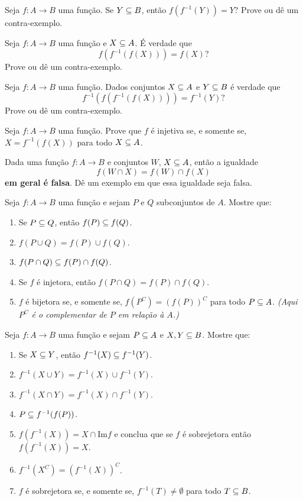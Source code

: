 \documentclass[12pt]{exam}
\begin{document}
\questao{} Seja $f : A \to B$ uma função. Se $Y \subseteq B$, então $f(f^{-1}(Y)) = Y$? Prove ou dê um contra-exemplo.

\vspace{.3cm}

\questao{} Seja $f : A \to B$ uma função e $X \subseteq A$. É verdade que
\[
    f(f^{-1}(f(X))) = f(X)?
\]
Prove ou dê um contra-exemplo.

\vspace{.3cm}

\questao{} Seja $f : A \to B$ uma função. Dados conjuntos $X \subseteq A$ e $Y \subseteq B$ é verdade que
\[
    f^{-1}(f(f^{-1}(f(X)))) = f^{-1}(Y)?
\]
Prove ou dê um contra-exemplo.

\vspace{.3cm}

\questao{} Seja $f : A \to B$ uma função. Prove que $f$ é injetiva se, e somente se, $X = f^{-1}(f(X))$ para todo $X \subseteq A$.

\vspace{.3cm}

\questao{} Dada uma função $f : A \to B$ e conjuntos $W$, $X \subseteq A$, então a igualdade
\[
    f(W \cap X) = f(W) \cap f(X)
\]
\textbf{em geral é falsa}. Dê um exemplo em que essa igualdade seja falsa.

\vspace{.3cm}

\questao{} Seja $f : A \to B$ uma fun\c{c}\~ao e sejam $P$ e $Q$ subconjuntos de $A$. Mostre que:
\begin{enumerate}[label={\alph*})]
    \item Se $P\subseteq Q$, ent{\~a}o $f(P)\subseteq f(Q)$.
    \item $f(P\cup Q) = f(P)\cup f(Q)$.
    \item $f(P\cap Q)\subseteq f(P)\cap f(Q)$.
    \item Se $f$ {\'e} injetora, ent{\~a}o $f(P\cap Q) =  f(P)\cap f(Q)$.
    \item $f$ {\'e} bijetora se, e somente se, $f(P^C) = (f(P))^C$ para todo $P \subseteq A$. \textit{(Aqui $P^C$ \'e o complementar de $P$ em rela\c{c}\~ao \`a $A$.)}
\end{enumerate}

\vspace{.3cm}

\questao{} Seja $f : A \to B$ uma fun{\c c}{\~a}o e sejam $P \subseteq
A$ e $X, Y\subseteq B$. Mostre que:
\begin{enumerate}[label={\alph*})]
    \item Se $X\subseteq Y$, ent{\~a}o $f^{-1}(X)\subseteq f^{-1}(Y)$.
    \item $f^{-1}(X\cup Y)=f^{-1}(X)\cup f^{-1}(Y)$.
    \item $f^{-1}(X\cap Y)= f^{-1}(X)\cap f^{-1}(Y)$.
    \item $P\subseteq f^{-1}(f(P))$.
    \item $f(f^{-1}(X))= X \cap \mbox{Im}f$ e conclua que se $f$ {\'e} sobrejetora ent{\~a}o
    $f(f^{-1}(X))=X$.
    \item $f^{-1}(X^C) = (f^{-1}(X))^C$.
    \item $f$ \'e sobrejetora se, e somente se, $f^{-1}(T) \ne \emptyset$ para todo $T \subseteq B$.
\end{enumerate}
\end{document}
